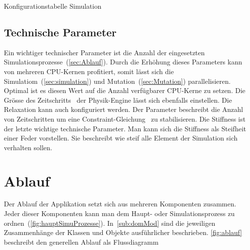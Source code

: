     \begin{table}[H]
      
      \caption{Konfigurationstabelle Simulation\label{tbl:simulation-parameters-general}}
    \end{table}

    \subsection{Technische Parameter}
      Ein wichtiger technischer Parameter ist die Anzahl der eingesetzten Simulationsprozesse~(\vref{sec:Ablauf}).
      Durch die Erhöhung dieses Parameters kann von mehreren CPU-Kernen profitiert, somit lässt sich die Simulatiom~(\vref{sec:simulation}) und Mutation~(\vref{sec:Mutation}) parallelisieren.
      Optimal ist es diesen Wert auf die Anzahl verfügbarer CPU-Kerne zu setzen.
      Die Grösse des Zeitschritts~\cite{bullet:steppingTheWorld} der Physik-Engine lässt sich ebenfalls einstellen.
      Die Relaxation kann auch konfiguriert werden. Der Parameter beschreibt die Anzahl von Zeitschritten um eine Constraint-Gleichung~\cite{gamedev:constraints} zu stabilisieren.
      Die Stiffness ist der letzte wichtige technische Parameter. Man kann sich die Stiffness als Steifheit einer Feder vorstellen.
      Sie beschreibt wie steif alle Element der Simulation sich verhalten sollen.


  \section{Ablauf\label{sec:Ablauf}}

    Der Ablauf der Applikation setzt sich aus mehreren Komponenten zusammen.
    Jeder dieser Komponenten kann man dem Haupt- oder Simulationsprozess zu ordnen~(\vref{fig:hauptSimuProzesse}).
    In~\vref{sub:domMod} sind die jeweiligen Zusammenhänge der Klassen und Objekte ausführlicher beschrieben.
    \vref{fig:ablauf} beschreibt den generellen Ablauf als Flussdiagramm

